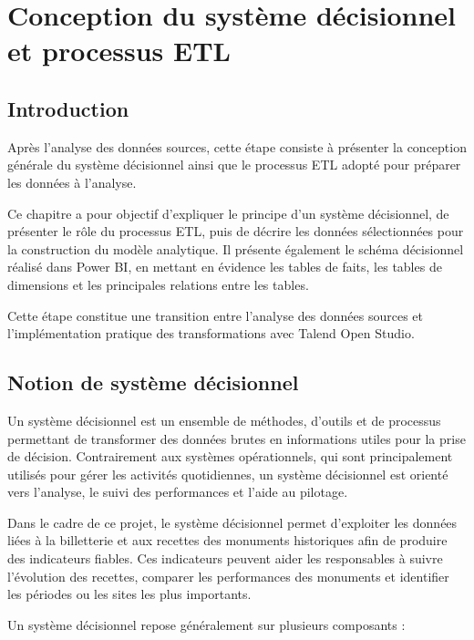 \documentclass[12pt,a4paper]{report}
\begin{document}
\chapter{Conception du système décisionnel et processus ETL}

\section*{Introduction}

Après l’analyse des données sources, cette étape consiste à présenter la conception générale du système décisionnel ainsi que le processus ETL adopté pour préparer les données à l’analyse.

Ce chapitre a pour objectif d’expliquer le principe d’un système décisionnel, de présenter le rôle du processus ETL, puis de décrire les données sélectionnées pour la construction du modèle analytique. Il présente également le schéma décisionnel réalisé dans Power BI, en mettant en évidence les tables de faits, les tables de dimensions et les principales relations entre les tables.

Cette étape constitue une transition entre l’analyse des données sources et l’implémentation pratique des transformations avec Talend Open Studio.


\section{Notion de système décisionnel}

Un système décisionnel est un ensemble de méthodes, d’outils et de processus permettant de transformer des données brutes en informations utiles pour la prise de décision. Contrairement aux systèmes opérationnels, qui sont principalement utilisés pour gérer les activités quotidiennes, un système décisionnel est orienté vers l’analyse, le suivi des performances et l’aide au pilotage.

Dans le cadre de ce projet, le système décisionnel permet d’exploiter les données liées à la billetterie et aux recettes des monuments historiques afin de produire des indicateurs fiables. Ces indicateurs peuvent aider les responsables à suivre l’évolution des recettes, comparer les performances des monuments et identifier les périodes ou les sites les plus importants.

Un système décisionnel repose généralement sur plusieurs composants :
\end{document}
